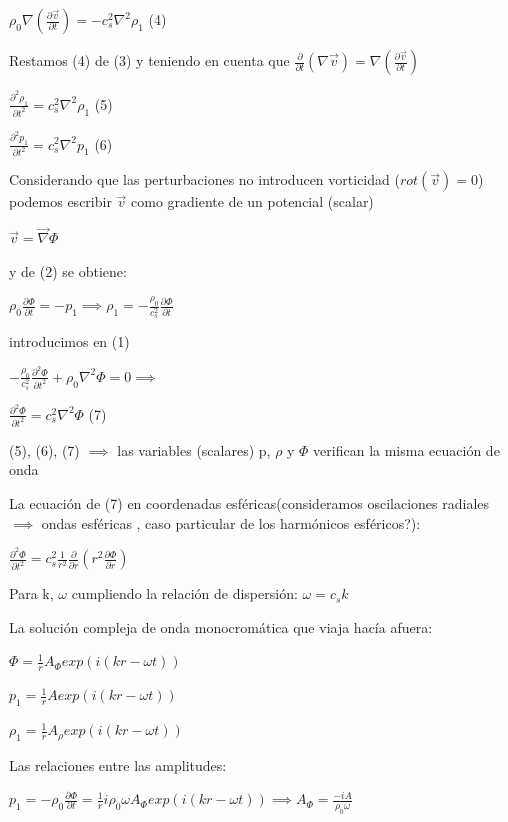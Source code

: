 \documentclass[10pt]{book}
\begin{document}
$\rho_0 \nabla(\frac{\partial \vec{v}}{\partial t}) = -c_s^2 \nabla^2 \rho_1$ (4)

Restamos (4) de (3) y teniendo en cuenta que $\frac{\partial}{\partial t}(\nabla \vec{v}) = \nabla(\frac{\partial \vec{v}}{\partial t})$ 

$\frac{\partial^2 \rho_1}{\partial t^2} = c_s^2 \nabla^2 \rho_1$ (5)

$\frac{\partial^2 p_1}{\partial t^2} = c_s^2 \nabla^2 p_1$  (6)

Considerando que las perturbaciones no introducen vorticidad ($rot(\vec{v}) = 0$) podemos escribir $\vec{v}$ como gradiente de un potencial (scalar)

$\vec{v} = \vec{\nabla} \Phi$
 
y de (2) se obtiene:

$\rho_0 \frac{\partial \Phi}{\partial t} = - p_1 \implies \rho_1 = -\frac{\rho_0}{c_s^2} \frac{\partial \Phi}{\partial t}$

introducimos en (1)

$-\frac{\rho_0}{c_s^2} \frac{\partial^2 \Phi}{\partial t^2} + \rho_0 \nabla^2 \Phi  = 0 \implies $

$\frac{\partial^2 \Phi}{\partial t^2} = c_s^2  \nabla^2 \Phi $ (7)

(5), (6), (7) $\implies$ las variables (scalares) p, $\rho$ y $\Phi$ verifican la misma ecuación de onda


La ecuación de (7) en coordenadas esféricas(consideramos oscilaciones radiales $\implies$ ondas esféricas , caso particular de los harmónicos esféricos?):

$\frac{\partial^2 \Phi}{\partial t^2} = c_s^2  \frac{1}{r^2} \frac{\partial}{\partial r} (r^2 \frac{\partial \Phi}{\partial r})   $ 

Para k, $\omega$ cumpliendo la relación de dispersión: $\omega = c_s  k$


La solución  compleja de  onda monocromática que viaja hacía afuera:


$\Phi = \frac{1}{r} A_{\Phi}exp(i(kr-\omega t)) $

$p_1 = \frac{1}{r} A exp(i(kr-\omega t)) $

$\rho_1 = \frac{1}{r} A_{\rho} exp(i(kr-\omega t)) $

Las relaciones entre las amplitudes:

$p_1 = -\rho_0 \frac{\partial \Phi}{\partial t}  = \frac{1}{r} i \rho_0 \omega A_{\Phi} exp(i(kr-\omega t)) \implies A_{\Phi} = \frac{-i A}{\rho_0 \omega }$
\end{document}
